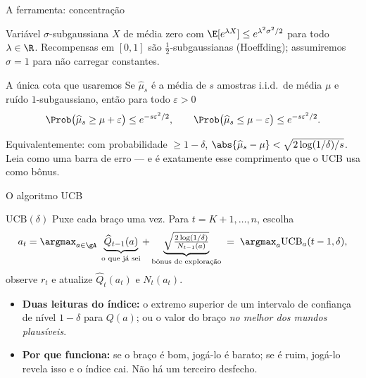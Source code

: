 \documentclass[aspectratio=169, 11pt]{beamer}
\newcommand{\Qh}{\widehat{Q}}
\newcommand{\muh}{\widehat{\mu}}
\newcommand{\ucb}{\mathrm{UCB}}
\begin{document}
\begin{frame}{A ferramenta: concentração}
  \begin{defbox}{Variável $\sigma$-subgaussiana}
    $X$ de média zero com
    $\E[e^{\lambda X}] \le e^{\lambda^{2}\sigma^{2}/2}$ para todo
    $\lambda\in\R$. Recompensas em $[0,1]$ são $\tfrac12$-subgaussianas
    (Hoeffding); assumiremos $\sigma=1$ para não carregar constantes.
  \end{defbox}

  \begin{teobox}{A única cota que usaremos}
    Se $\muh_s$ é a média de $s$ amostras i.i.d.\ de média $\mu$ e ruído
    $1$-subgaussiano, então para todo $\varepsilon>0$
    \[
      \Prob\bigl(\muh_s \ge \mu+\varepsilon\bigr) \le e^{-s\varepsilon^{2}/2},
      \qquad
      \Prob\bigl(\muh_s \le \mu-\varepsilon\bigr) \le e^{-s\varepsilon^{2}/2}.
    \]
  \end{teobox}

  \begin{ideiabox}
    Equivalentemente: com probabilidade $\ge 1-\delta$,
    $\abs{\muh_s-\mu} < \sqrt{2\log(1/\delta)/s}$. Leia como uma \alert{barra de
    erro} --- e é exatamente esse comprimento que o UCB usa como bônus.
  \end{ideiabox}
\end{frame}

\begin{frame}{O algoritmo UCB}
  \begin{algbox}{$\ucb(\delta)$}
    {\small Puxe cada braço uma vez. Para $t=K+1,\dots,n$, escolha
    \[
      a_t = \argmax_{a\in\gA}\;
        \underbrace{\Qh_{t-1}(a)}_{\text{o que já sei}}
        + \underbrace{\sqrt{\tfrac{2\log(1/\delta)}{N_{t-1}(a)}}}_{\text{bônus de exploração}}
      \;=\; \argmax_a \ucb_a(t-1,\delta),
    \]
    observe $r_t$ e atualize $\Qh_t(a_t)$ e $N_t(a_t)$.}
  \end{algbox}

  \begin{itemize}\small
    \item \textbf{Duas leituras do índice:} o extremo superior de um intervalo
          de confiança de nível $1-\delta$ para $Q(a)$; ou o valor do braço
          \emph{no melhor dos mundos plausíveis}.
    \item \textbf{Por que funciona:} se o braço é bom, jogá-lo é barato; se é
          ruim, jogá-lo revela isso e o índice cai. Não há um terceiro desfecho.
  \end{itemize}
\end{frame}
\end{document}
